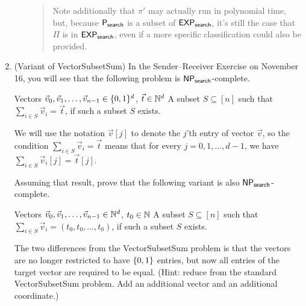 \documentclass[11pt]{article}
\begin{document}
\begin{enumerate}
\begin{enumerate}
\begin{quote}
    Note additionally that $\pi'$ may actually run in polynomial time, but, because $\mathsf{P_{search}}$ is a subset of $\mathsf{EXP_{search}}$, it's still the case that $\Pi$ is in $\mathsf{EXP_{search}}$, even if a more specific classification could also be provided. 
\end{quote}
    \end{enumerate}

\newpage

\item (Variant of VectorSubsetSum)  
In the Sender--Receiver Exercise on November 16, you will see that the following problem is $\mathsf{NP_{search}}$-complete.

{Vectors $\vec{v}_0,\vec{v}_1,\ldots,\vec{v}_{n-1}\in \{0,1\}^d$, $\vec{t}\in \mathbb{N}^d$}
{A subset $S\subseteq [n]$ such that $\sum_{i\in S}\vec{v}_i = \vec{t}$, if such a subset $S$ exists.}

We will use the notation $\vec{v}[j]$ to denote the $j$'th entry of vector $\vec{v}$, so the condition 
$\sum_{i\in S}\vec{v}_i = \vec{t}$ means that for every $j=0,1,\ldots,d-1$, we have $\sum_{i\in S}\vec{v}_i[j] = \vec{t}[j]$.

Assuming that result, prove that the following variant is also $\mathsf{NP_{search}}$-complete.
    
{Vectors $\vec{v}_0,\vec{v}_1,\ldots,\vec{v}_{n-1}\in \mathbb{N}^d$, $t_0\in \mathbb{N}$}
{A subset $S\subseteq [n]$ such that $\sum_{i\in S}\vec{v}_i = (t_0,t_0,\ldots,t_0)$, if such a subset $S$ exists.}

    The two differences from the VectorSubsetSum problem is that the vectors are no longer restricted to have $\{0,1\}$ entries, but now all entries of the target vector are required to be equal. (Hint: reduce from the standard VectorSubsetSum problem.  Add an additional vector and an additional coordinate.)

    \end{enumerate}
\end{document}
